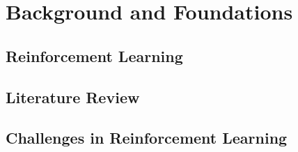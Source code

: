 
\chapter{Background and Foundations}\label{chapter:Background and Foundations}

\section{Reinforcement Learning}


\section{Literature Review}

\section{Challenges in Reinforcement Learning}